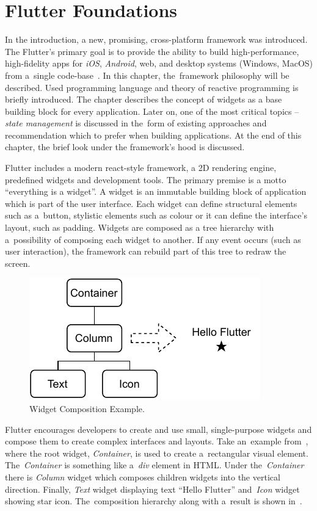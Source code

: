 \chapter{Flutter Foundations}
\label{ch:flutter}
In the introduction, a new, promising, cross-platform framework was introduced. The Flutter's primary goal is to provide the ability to build high-performance, high-fidelity apps for \textit{iOS}, \textit{Android}, web, and desktop systems (Windows, MacOS) from a~single code-base~\cite{flutter-technical-overview}. In this chapter, the~framework philosophy will be described. Used programming language and theory of reactive programming is briefly introduced. The chapter describes the concept of widgets as a base building block for every application. Later on, one of the most critical topics -- \textit{state management} is discussed in the~form of existing approaches and recommendation which to prefer when building applications. At the end of this chapter, the brief look under the framework's hood is discussed.

Flutter includes a modern react-style framework, a 2D rendering engine, predefined widgets and development tools. The primary premise is a motto ``everything is a widget''. A widget is an immutable building block of application which is part of the user interface. Each widget can define structural elements such as a~button, stylistic elements such as colour or it can define the interface's layout, such as padding. Widgets are composed as a tree hierarchy with a~possibility of composing each widget to another. If any event occurs (such as user interaction), the framework can rebuild part of this tree to redraw the screen.  

\begin{figure}[htp]
    \centering
    \includegraphics[width=0.5\linewidth]{img/flutter/hello-flutter.pdf}
    \caption{Widget Composition Example.}
    \label{fig:hello-flutter}
\end{figure}

Flutter encourages developers to create and use small, single-purpose widgets and compose them to create complex interfaces and layouts. Take an~example from~, where the root widget, \textit{Container}, is used to create a~rectangular visual element. The~\textit{Container} is something like a~\textit{div} element in HTML. Under the~\textit{Container} there is \textit{Column} widget which composes children widgets into the vertical direction. Finally, \textit{Text} widget displaying text ``Hello Flutter'' and~\textit{Icon} widget showing star icon. The~composition hierarchy along with a~result is shown in~.

